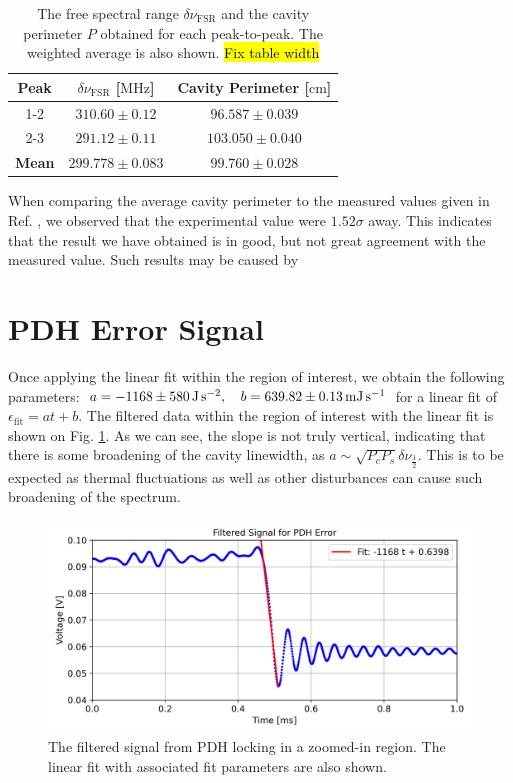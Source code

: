 \documentclass[a4paper]{report}
\numberwithin{equation}{section}
\begin{document}
\begin{table}[h!]
	\centering
	\begin{tabular}{|c|c|c|}
		\hline 
		Peak & $\delta\nu_{\mathrm{FSR}}$ [$\si{\mega\hertz}$] & Cavity Perimeter [$\si{\centi\meter}$]\\ \hline
		1-2 & $310.60 \pm 0.12$ & $96.587 \pm 0.039$ \\ \hline
		2-3 & $291.12 \pm 0.11$ & $103.050 \pm 0.040$ \\ \hline
		\textbf{Mean} & \textbf{$299.778 \pm 0.083$} & \textbf{$99.760 \pm 0.028$} \\ \hline
	\end{tabular}
	\caption{The free spectral range $\delta\nu_{\mathrm{FSR}}$ and the cavity perimeter $P$ obtained for each
			peak-to-peak. The weighted average is also shown. \hl{Fix table width}}
	\label{tab:fsr_peri}
\end{table}

When comparing the average cavity perimeter to the measured values given in Ref. \cite{Groh2021},
we observed that the experimental value were $1.52\sigma$ away. This indicates that the 
result we have obtained is in good, but not great agreement with the measured value. Such results may be caused by \par 

\section{PDH Error Signal}

Once applying the linear fit within the region of interest, we obtain 
the following parameters: $a = \SI{-1168 \pm 580}{\joule\per\second\squared}, \quad b = \SI{639.82 \pm 0.13}{\milli\joule\per\second}$
for a linear fit of $\epsilon_{\mathrm{fit}} = a t + b$. The filtered data within the region of interest
 with the linear fit is shown on Fig. \ref{fig:pdh_err_filt_fit}. As we can see, the slope is not truly vertical, indicating that there is some broadening of the 
 cavity linewidth, as $a \sim \sqrt{P_c P_s} \delta\nu_{\frac{1}{2}}$. 
 This is to be expected as thermal fluctuations as well as other disturbances can cause such broadening of the spectrum.  

 \begin{figure}[h!]
	\centering
	\includegraphics[width=0.8\columnwidth]{pdh_err_filt_fit.png}
	\caption{The filtered signal from PDH locking in a zoomed-in region. The linear fit with associated fit parameters are 
	also shown.}
	\label{fig:pdh_err_filt_fit}
\end{figure}
\end{document}
